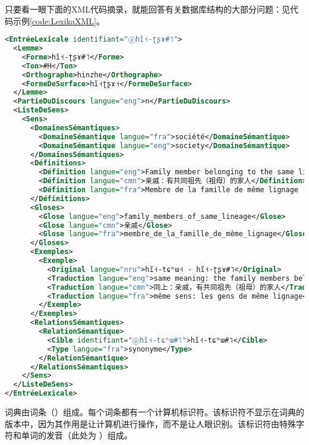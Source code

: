 只要看一眼下面的XML代码摘录，就能回答有关数据库结构的大部分问题：见代码示例\ref{code:LexikaXML}。

\begin{lstlisting}[language=XML, caption=说明词条结构的XML代码摘录, label=code:LexikaXML]
<EntréeLexicale identifiant="ⓔhĩ˧-ʈʂɤ#˥">
  <Lemme>
    <Forme>hĩ˧-ʈʂɤ#˥</Forme>
    <Ton>#H</Ton>
    <Orthographe>hinzhe</Orthographe>
    <FormeDeSurface>hĩ˧ʈʂɤ˧</FormeDeSurface>
  </Lemme>
  <PartieDuDiscours langue="eng">n</PartieDuDiscours>
  <ListeDeSens>
    <Sens>
      <DomainesSémantiques>
        <DomaineSémantique langue="fra">société</DomaineSémantique>
        <DomaineSémantique langue="eng">society</DomaineSémantique>
      </DomainesSémantiques>
      <Définitions>
        <Définition langue="eng">Family member belonging to the same lineage (on the mother's side).</Définition>
        <Définition langue="cmn">亲戚：有共同祖先（祖母）的家人</Définition>
        <Définition langue="fra">Membre de la famille de même lignage (du côté maternel).</Définition>
      </Définitions>
      <Gloses>
        <Glose langue="eng">family_members_of_same_lineage</Glose>
        <Glose langue="cmn">亲戚</Glose>
        <Glose langue="fra">membre_de_la_famille_de_même_lignage</Glose>
      </Gloses>
      <Exemples>
        <Exemple>
          <Original langue="nru">hĩ˧-tɕʰɯ˧ - hĩ˧-ʈʂɤ#˥</Original>
          <Traduction langue="eng">same meaning: the family members belonging to the same lineage</Traduction>
          <Traduction langue="cmn">同上：亲戚，有共同祖先（祖母）的家人</Traduction>
          <Traduction langue="fra">même sens: les gens de même lignage</Traduction>
        </Exemple>
      </Exemples>
      <RelationsSémantiques>
        <RelationSémantique>
          <Cible identifiant="ⓔhĩ˧-tɕʰɯ#˥">hĩ˧-tɕʰɯ#˥</Cible>
          <Type langue="fra">synonyme</Type>
        </RelationSémantique>
      </RelationsSémantiques>
    </Sens>
  </ListeDeSens>
</EntréeLexicale>
\end{lstlisting}


词典由词条（）组成。每个词条都有一个计算机标识符。该标识符不显示在词典的版本中，因为其作用是让计算机进行操作，而不是让人眼识别。该标识符由特殊字符和单词的发音（此处为 ）组成。


